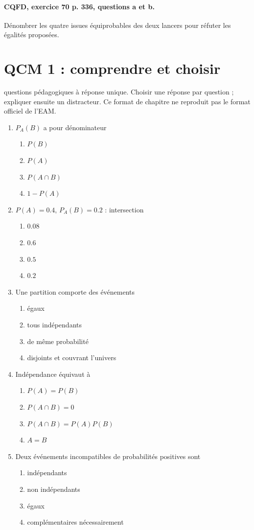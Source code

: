 \paragraph{CQFD, exercice 70 p. 336, questions a et b.}\label{C05-M2} Dénombrer les quatre issues équiprobables des deux lancers pour réfuter les égalités proposées.
\begingroup\small
\mxnewpage\section*{QCM 1 : comprendre et choisir}\label{C05-Q1}
 questions pédagogiques à réponse unique. Choisir une réponse par question ; expliquer ensuite un distracteur. Ce format de chapitre ne reproduit pas le format officiel de l’EAM.
\begin{enumerate}
\item $P_A(B)$ a pour dénominateur
\begin{enumerate}[label=\Alph*.,itemsep=2pt]
\item $P(B)$
\item $P(A)$
\item $P(A\cap B)$
\item $1-P(A)$
\end{enumerate}
\item $P(A)=\num{0,4}$, $P_A(B)=\num{0,2}$ : intersection
\begin{enumerate}[label=\Alph*.,itemsep=2pt]
\item $\num{0,08}$
\item $\num{0,6}$
\item $\num{0,5}$
\item $\num{0,2}$
\end{enumerate}
\item Une partition comporte des événements
\begin{enumerate}[label=\Alph*.,itemsep=2pt]
\item égaux
\item tous indépendants
\item de même probabilité
\item disjoints et couvrant l’univers
\end{enumerate}
\item Indépendance équivaut à
\begin{enumerate}[label=\Alph*.,itemsep=2pt]
\item $P(A)=P(B)$
\item $P(A\cap B)=0$
\item $P(A\cap B)=P(A)P(B)$
\item $A=B$
\end{enumerate}
\item Deux événements incompatibles de probabilités positives sont
\begin{enumerate}[label=\Alph*.,itemsep=2pt]
\item indépendants
\item non indépendants
\item égaux
\item complémentaires nécessairement
\end{enumerate}
\end{enumerate}
